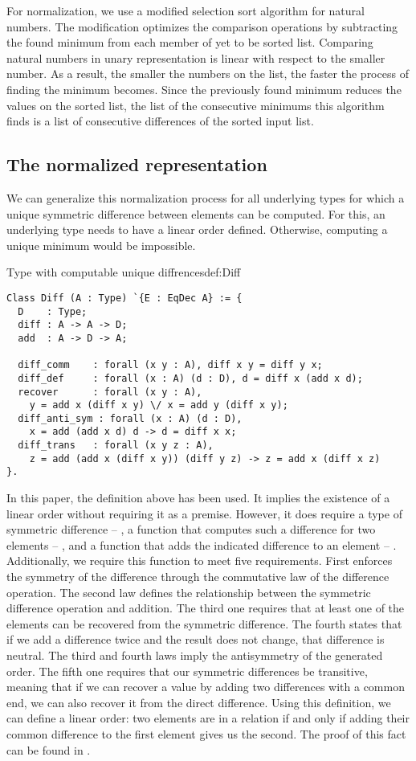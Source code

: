 For normalization, we use a modified selection sort algorithm for natural numbers. The modification optimizes the comparison operations by subtracting the found minimum from each member of yet to be sorted list. Comparing natural numbers in unary representation is linear with respect to the smaller number. As a result, the smaller the numbers on the list, the faster the process of finding the minimum becomes. Since the previously found minimum reduces the values on the sorted list, the list of the consecutive minimums this algorithm finds is a list of consecutive differences of the sorted input list.
\subsection{The normalized representation}
We can generalize this normalization process for all underlying types for which a unique symmetric difference between elements can be computed. For this, an underlying type needs to have a linear order defined. Otherwise, computing a unique minimum would be impossible.
\begin{defi}{Type with computable unique diffrences}{def:Diff}
\begin{verbatim}
Class Diff (A : Type) `{E : EqDec A} := {
  D    : Type;
  diff : A -> A -> D;
  add  : A -> D -> A;

  diff_comm    : forall (x y : A), diff x y = diff y x;
  diff_def     : forall (x : A) (d : D), d = diff x (add x d);
  recover      : forall (x y : A), 
    y = add x (diff x y) \/ x = add y (diff x y);
  diff_anti_sym : forall (x : A) (d : D), 
    x = add (add x d) d -> d = diff x x;
  diff_trans   : forall (x y z : A), 
    z = add (add x (diff x y)) (diff y z) -> z = add x (diff x z)
}.
\end{verbatim}
\end{defi}
In this paper, the definition above has been used. It implies the existence of a linear order without requiring it as a premise. However, it does require a type of symmetric difference -- , a function that computes such a difference for two elements -- , and a function that adds the indicated difference to an element -- . Additionally, we require this function to meet five requirements. First enforces the symmetry of the difference through the commutative law of the difference operation. The second law defines the relationship between the symmetric difference operation and addition. The third one requires that at least one of the elements can be recovered from the symmetric difference. The fourth states that if we add a difference twice and the result does not change, that difference is neutral. The third and fourth laws imply the antisymmetry of the generated order. The fifth one requires that our symmetric differences be transitive, meaning that if we can recover a value by adding two differences with a common end, we can also recover it from the direct difference. Using this definition, we can define a linear order: two elements are in a relation if and only if adding their common difference to the first element gives us the second. The proof of this fact can be found in .

